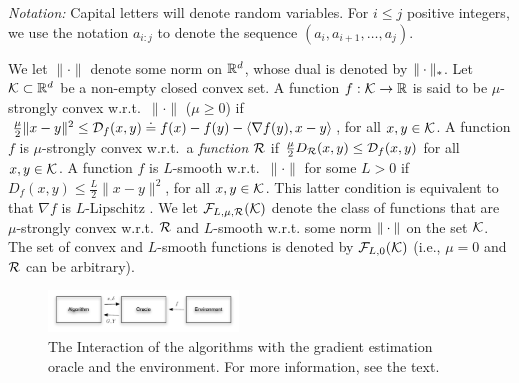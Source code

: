 
\textit{Notation:} Capital letters will denote random variables.
For $i\le j$ positive integers,
 we use the notation $a_{i:j}$ to denote
 the sequence $(a_i,a_{i+1}, \dots, a_{j})$.

 We let $\| \cdot \|$ denote some norm on $\mathbb{R}^d$, whose dual is denoted by $\|\cdot\|_*$. Let $\mathcal{K} \subset \mathbb{R}^d$ be a non-empty closed convex  set. A function $f:\mathcal{K} \to \mathbb{R}$ is said to be $\mu$-strongly convex w.r.t.\  $\| \cdot \|$  ($\mu\ge 0$) if
 $\tfrac{\mu}{2} \|x-y\|^2 \le \mathcal{D}_f(x,y)\doteq f(x)-f(y)-\langle \nabla f(y),x-y \rangle$, for all $x,y \in \mathcal{K}$.
A function $f$ is $\mu$-strongly convex w.r.t.\  a \emph{function} $\mathcal{R}$
	if $\tfrac{\mu}{2}D_{\mathcal{R}}(x,y)\le\mathcal{D}_f(x,y)$ for all $x,y \in \mathcal{K}$.
 A function $f$ is $L$-smooth w.r.t.\  $\| \cdot \|$ for some $L>0$ if
$D_f(x,y) \le \tfrac{L}{2} \|x-y\|^2$, for all $x,y \in \mathcal{K}$.
 This latter condition is equivalent to that $\nabla f$ is $L$-Lipschitz \citep[Theorem~2.1.5]{nesterov2004introductory}.
 We let $\mathcal{F}_{L,\mu, \mathcal{R}}(\mathcal{K})$ denote the class of functions that are $\mu$-strongly convex w.r.t. $\mathcal{R}$ and $L$-smooth w.r.t. some norm $\|\cdot\|$ on the set $\mathcal{K}$.
 The set of convex and $L$-smooth functions is denoted by $\mathcal{F}_{L,0}(\mathcal{K})$ (i.e., $\mu=0$ and $\mathcal{R}$ can be arbitrary).

\begin{figure}
\begin{center}
\vspace{-0.1cm}
\includegraphics[width=0.45\textwidth]{../figs/oracle}
\end{center}
\vspace{-0.6cm}
\caption{The Interaction of the algorithms with the gradient estimation oracle and the environment. For more information, see the text. \vspace{-0.3cm}}
\label{fig:oracle}
\end{figure}

